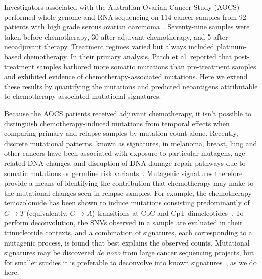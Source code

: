 Investigators associated with the Australian Ovarian Cancer Study (AOCS) performed whole genome and RNA sequencing on 114 cancer samples from 92 patients with high grade serous ovarian carcinoma~\cite{Patch_2015}. Seventy-nine samples were taken before chemotherapy, 30 after adjuvant chemotherapy, and 5 after neoadjuvant therapy. Treatment regimes varied but always included platinum-based chemotherapy. In their primary analysis, Patch et al. reported that post-treatment samples harbored more somatic mutations than pre-treatment samples and exhibited evidence of chemotherapy-associated mutations. Here we extend these results by quantifying the mutations and predicted neoantigens attributable to chemotherapy-associated mutational signatures.

Because the AOCS patients received adjuvant chemotherapy, it isn't possible to distinguish chemotherapy-induced mutations from temporal effects when comparing primary and relapse samples by mutation count alone. Recently, discrete mutational patterns, known as signatures, in melanoma, breast, lung and other cancers have been associated with exposure to particular mutagens, age related DNA changes, and disruption of DNA damage repair pathways due to somatic mutations or germline risk variants~\cite{Alexandrov2013}. Mutagenic signatures therefore provide a means of identifying the contribution that chemotherapy may make to the mutational changes seen in relapse samples. For example, the chemotherapy temozolomide has been shown to induce mutations consisting predominantly of $C \rightarrow T$ (equivalently, $G \rightarrow A$) transitions at CpC and CpT dinucleotides~\cite{Johnson_2013}. To perform deconvolution, the SNVs observed in a sample are evaluated in their trinucleotide contexts, and a combination of signatures, each corresponding to a mutagenic process, is found that best explains the observed counts. Mutational signatures may be discovered \textit{de novo} from large cancer sequencing projects, but for smaller studies it is preferable to deconvolve into known signatures~\cite{Rosenthal_2016}, as we do here.


